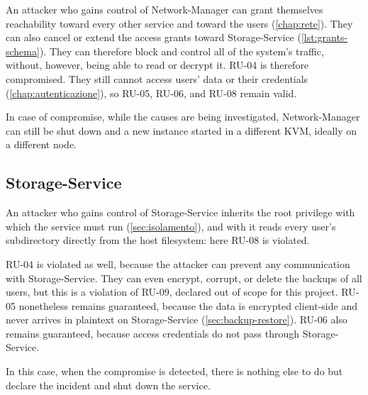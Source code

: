 An attacker who gains control of Network-Manager can grant themselves reachability toward every other
service and toward the users (\autoref{chap:rete}). They can also cancel or extend the access grants toward
Storage-Service (\autoref{lst:grants-schema}).
They can therefore block and control all of the system's traffic, without, however, being able to read or decrypt it.
RU-04 is therefore compromised.
They still cannot access users' data or their credentials (\autoref{chap:autenticazione}), so
RU-05, RU-06, and RU-08 remain valid.

In case of compromise, while the causes are being investigated, Network-Manager can still be shut down and
a new instance started in a different KVM, ideally on a different node.

\subsection{Storage-Service}

An attacker who gains control of Storage-Service inherits the root privilege with which the
service must run (\autoref{sec:isolamento}), and with it reads every user's subdirectory
directly from the host filesystem: here RU-08 is violated.

RU-04 is violated as well, because the attacker can prevent any communication with Storage-Service.
They can even encrypt, corrupt, or delete the backups of all users, but this is a violation of RU-09,
declared out of scope for this project.
RU-05 nonetheless remains guaranteed, because the data is encrypted client-side and never arrives in plaintext on
Storage-Service (\autoref{sec:backup-restore}).
RU-06 also remains guaranteed, because access credentials do not pass through Storage-Service.

In this case, when the compromise is detected, there is nothing else to do but declare
the incident and shut down the service.
